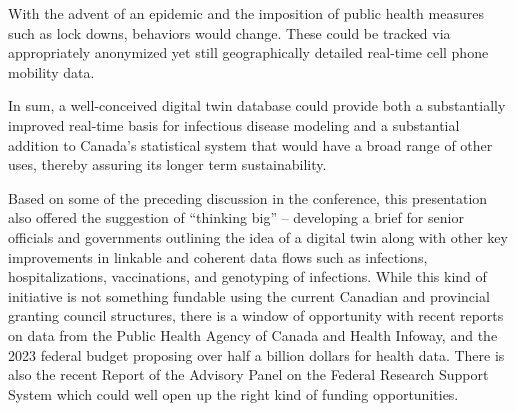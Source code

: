 With the advent of an epidemic and the imposition of public health
measures such as lock downs, behaviors would change. These could be
tracked via appropriately anonymized yet still geographically detailed
real-time cell phone mobility data.

In sum, a well-conceived digital twin database could provide both a
substantially improved real-time basis for infectious disease modeling
and a substantial addition to Canada's statistical system that would
have a broad range of other uses, thereby assuring its longer term
sustainability.

Based on some of the preceding discussion in the conference, this
presentation also offered the suggestion of ``thinking big'' --
developing a brief for senior officials and governments outlining the
idea of a digital twin along with other key improvements in linkable and
coherent data flows such as infections, hospitalizations, vaccinations,
and genotyping of infections. While this kind of initiative is not
something fundable using the current Canadian and provincial granting
council structures, there is a window of opportunity with recent reports
on data from the Public Health Agency of Canada and Health Infoway, and
the 2023 federal budget proposing over half a billion dollars for health
data. There is also the recent Report of the Advisory Panel on the
Federal Research Support System which could well open up the right kind
of funding opportunities.
